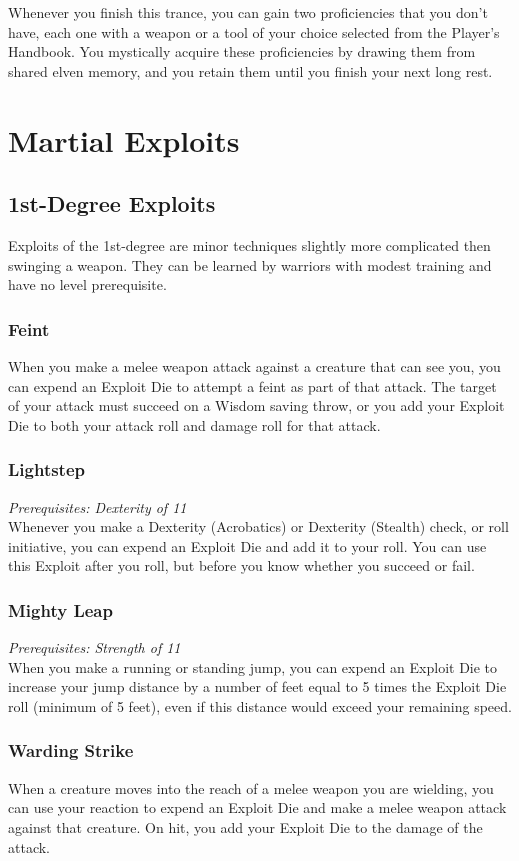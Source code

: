 \documentclass[letterpaper,justified,openany,oneside,twocolumn]{dndbook}
\begin{document}
Whenever you finish this trance, you can gain two proficiencies that you don't have, each one with a weapon or a tool of your choice selected from the Player's Handbook. You mystically acquire these proficiencies by drawing them from shared elven memory, and you retain them until you finish your next long rest.

\section*{Martial Exploits}
\subsection*{1st-Degree Exploits}
Exploits of the 1st-degree are minor techniques slightly more complicated then swinging a weapon. They can be learned by warriors with modest training and have no level prerequisite.

\subsubsection*{Feint}
When you make a melee weapon attack against a creature that can see you, you can expend an Exploit Die to attempt
a feint as part of that attack. The target of your attack must succeed on a Wisdom saving throw, or you add your Exploit Die to both your attack roll and damage roll for that attack.

\subsubsection*{Lightstep}
\textit{Prerequisites: Dexterity of 11}\\
Whenever you make a Dexterity (Acrobatics) or Dexterity (Stealth) check, or roll initiative, you can expend an Exploit Die and add it to your roll. You can use this Exploit after you roll, but before you know whether you succeed or fail.

\subsubsection*{Mighty Leap}
\textit{Prerequisites: Strength of 11}\\
When you make a running or standing jump, you can expend an Exploit Die to increase your jump distance by a number of feet equal to 5 times the Exploit Die roll (minimum of 5 feet), even if this distance would exceed your remaining speed.

\subsubsection*{Warding Strike}
When a creature moves into the reach of a melee weapon you are wielding, you can use your reaction to expend an Exploit Die and make a melee weapon attack against that creature. On hit, you add your Exploit Die to the damage of the attack.
\end{document}
